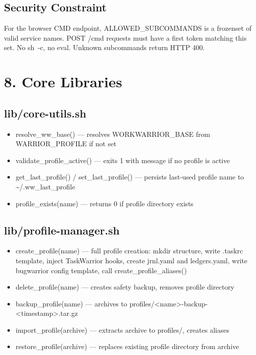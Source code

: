 \documentclass[11pt, a4paper, DIV=14]{scrartcl}
\renewcommand{\texttt}[1]{{\ttfamily\fontsize{8.5}{10.5}\selectfont\color{BabbNavy}#1}}
\let\origRule\rule
\renewcommand{\rule}[2]{\par\vspace{2pt}\noindent{\color{BabbBorder}\origRule[0pt]{#1}{#2}}\par\vspace{2pt}}
\begin{document}
\subsection{Security Constraint}\label{security-constraint}

For the browser CMD endpoint, \texttt{ALLOWED\_SUBCOMMANDS} is a
frozenset of valid service names. POST /cmd requests must have a first
token matching this set. No \texttt{sh\ -c}, no eval. Unknown
subcommands return HTTP 400.

\begin{center}\rule{0.5\linewidth}{0.5pt}\end{center}

\section{8. Core Libraries}\label{core-libraries}

\subsection{lib/core-utils.sh}\label{libcore-utils.sh}

\begin{itemize}
\tightlist
\item
  \texttt{resolve\_ww\_base()} --- resolves \texttt{WORKWARRIOR\_BASE}
  from \texttt{WARRIOR\_PROFILE} if not set
\item
  \texttt{validate\_profile\_active()} --- exits 1 with message if no
  profile is active
\item
  \texttt{get\_last\_profile()} / \texttt{set\_last\_profile()} ---
  persists last-used profile name to
  \texttt{\textasciitilde{}/.ww\_last\_profile}
\item
  \texttt{profile\_exists(name)} --- returns 0 if profile directory
  exists
\end{itemize}

\subsection{lib/profile-manager.sh}\label{libprofile-manager.sh}

\begin{itemize}
\tightlist
\item
  \texttt{create\_profile(name)} --- full profile creation: mkdir
  structure, write \texttt{.taskrc} template, inject TaskWarrior hooks,
  create \texttt{jrnl.yaml} and \texttt{ledgers.yaml}, write bugwarrior
  config template, call \texttt{create\_profile\_aliases()}
\item
  \texttt{delete\_profile(name)} --- creates safety backup, removes
  profile directory
\item
  \texttt{backup\_profile(name)} --- archives to
  \texttt{profiles/\textless{}name\textgreater{}-backup-\textless{}timestamp\textgreater{}.tar.gz}
\item
  \texttt{import\_profile(archive)} --- extracts archive to
  \texttt{profiles/}, creates aliases
\item
  \texttt{restore\_profile(archive)} --- replaces existing profile
  directory from archive
\end{itemize}
\end{document}
